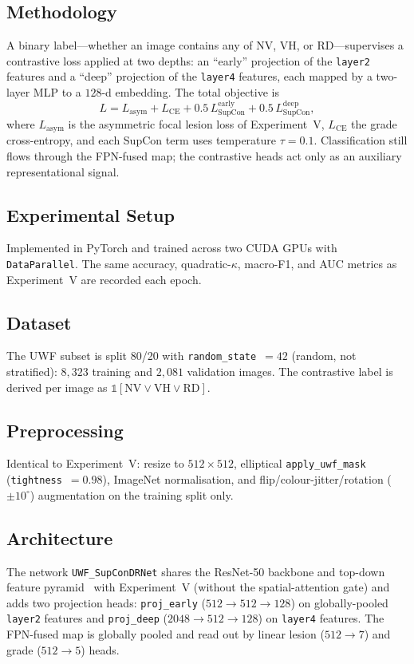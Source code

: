 \documentclass[journal,twoside,web]{ieeecolor}
\begin{document}
\subsection{Methodology}
A binary label---whether an image contains any of NV, VH, or RD---supervises a
contrastive loss applied at two depths: an ``early'' projection of the
\texttt{layer2} features and a ``deep'' projection of the \texttt{layer4} features,
each mapped by a two-layer MLP to a $128$-d embedding. The total objective is
\begin{equation}
L = L_{\mathrm{asym}} + L_{\mathrm{CE}}
  + 0.5\,L_{\mathrm{SupCon}}^{\mathrm{early}}
  + 0.5\,L_{\mathrm{SupCon}}^{\mathrm{deep}},
\label{eq:supcon}
\end{equation}
where $L_{\mathrm{asym}}$ is the asymmetric focal lesion loss of Experiment~V,
$L_{\mathrm{CE}}$ the grade cross-entropy, and each SupCon term uses temperature
$\tau=0.1$. Classification still flows through the FPN-fused map; the contrastive
heads act only as an auxiliary representational signal.

\subsection{Experimental Setup}
Implemented in PyTorch and trained across two CUDA GPUs with
\texttt{DataParallel}. The same accuracy, quadratic-$\kappa$, macro-F1, and AUC
metrics as Experiment~V are recorded each epoch.

\subsection{Dataset}
The UWF subset is split 80/20 with \texttt{random\_state}~$=42$ (random, not
stratified): $8{,}323$ training and $2{,}081$ validation images. The contrastive
label is derived per image as $\mathbb{1}[\text{NV}\lor\text{VH}\lor\text{RD}]$.

\subsection{Preprocessing}
Identical to Experiment~V: resize to $512\times512$, elliptical
\texttt{apply\_uwf\_mask} (\texttt{tightness}~$=0.98$), ImageNet normalisation, and
flip/colour-jitter/rotation ($\pm10^{\circ}$) augmentation on the training split
only.

\subsection{Architecture}
The network \texttt{UWF\_SupConDRNet} shares the ResNet-50 backbone and top-down
feature pyramid~\cite{fpn} with Experiment~V (without the spatial-attention gate)
and adds two projection heads: \texttt{proj\_early} ($512\!\rightarrow\!512\!
\rightarrow\!128$) on globally-pooled \texttt{layer2} features and
\texttt{proj\_deep} ($2048\!\rightarrow\!512\!\rightarrow\!128$) on \texttt{layer4}
features. The FPN-fused map is globally pooled and read out by linear lesion
($512\!\rightarrow\!7$) and grade ($512\!\rightarrow\!5$) heads.
\end{document}

